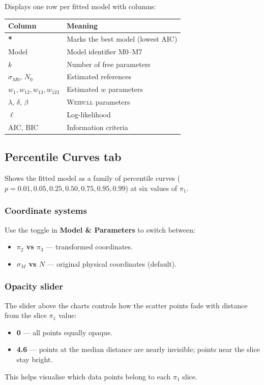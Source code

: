 \documentclass[11pt,a4paper]{article}
\newcommand{\piz}{\ensuremath{\pi_3}}
\newcommand{\pit}{\ensuremath{\pi_2}}
\newcommand{\pio}{\ensuremath{\pi_1}}
\newcommand{\sM}{\ensuremath{\sigma_M}}
\newcommand{\sMzero}{\ensuremath{\sigma_{M0}}}
\newcommand{\Nzero}{\ensuremath{N_0}}
\newcommand{\Weibull}{\textsc{Weibull}}
\begin{document}
Displays one row per fitted model with columns:
\begin{center}
\begin{tabular}{ll}
\toprule
\textbf{Column} & \textbf{Meaning} \\
\midrule
\textbf{*} & Marks the best model (lowest AIC) \\
Model & Model identifier M0--M7 \\
$k$ & Number of free parameters \\
$\sMzero$, $\Nzero$ & Estimated references \\
$w_1,w_{12},w_{13},w_{123}$ & Estimated $w$ parameters \\
$\lambda$, $\delta$, $\beta$ & \Weibull{} parameters \\
$\ell$ & Log-likelihood \\
AIC, BIC & Information criteria \\
\bottomrule
\end{tabular}
\end{center}

\subsection{Percentile Curves tab}
\label{sec:charts}

Shows the fitted model as a family of percentile curves ($p = 0.01, 0.05, 0.25, 0.50, 0.75, 0.95, 0.99$) at six values of $\pio$.

\subsubsection*{Coordinate systems}

Use the toggle in \textbf{Model \& Parameters} to switch between:
\begin{itemize}[leftmargin=1.4em]
  \item \textbf{$\pit$ vs $\piz$} --- transformed coordinates.
  \item \textbf{$\sM$ vs $N$} --- original physical coordinates (default).
\end{itemize}

\subsubsection*{Opacity slider}

The slider above the charts controls how the scatter points fade with distance from the slice $\pio$ value:
\begin{itemize}[leftmargin=1.4em]
  \item \textbf{0} --- all points equally opaque.
  \item \textbf{4.6} --- points at the median distance are nearly invisible; points near the slice stay bright.
\end{itemize}
This helps visualise which data points belong to each $\pio$ slice.
\end{document}
